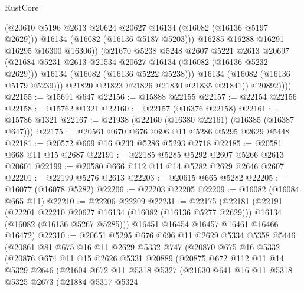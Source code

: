 \begin{lexlean}{RustCore}
\begin{coremodule}
                        (@20610 @5196 @2613 @20624 @20627 @16134 (@16082 (@16136 @5197 @2629)))
                        @16134
                        (@16082 (@16136 @5187 @5203)))
                      @16285
                      @16288
                      @16291
                      @16295
                      @16300
                      @16306))
                  (@21670
                    @5238
                    @5248
                    @2607
                    @5221
                    @2613
                    @20697
                    (@21684 @5231 @2613 @21534 @20627 @16134 (@16082 (@16136 @5232 @2629)))
                    @16134
                    (@16082 (@16136 @5222 @5238)))
                  @16134
                  (@16082 (@16136 @5179 @5239)))
                @21820
                @21823
                @21826
                @21830
                @21835
                @21841))
            @20892))))
@22155 := @15691 @647
@22156 := @15888 @22155
@22157 := @22154 @22156
@22158 := @15762 @1321
@22160 := @22157 (@16376 @22158)
@22161 := @15786 @1321
@22167 := @21938 (@22160 (@16380 @22161) (@16385 (@16387 @647)))
@22175 := @20561 @670 @676 @696 @11 @5286 @5295 @2629 @5448
@22181 := @20572 @669 @16 @233 @5286 @5293 @2718
@22185 := @20581 @668 @11 @15 @2687
@22191 := @22185 @5285 @5292 @2607 @5266 @2613 @20601
@22199 := @20580 @666 @112 @11 @14 @5282 @2629 @2646 @2607
@22201 := @22199 @5276 @2613
@22203 := @20615 @665 @5282
@22205 := @16077 (@16078 @5282)
@22206 := @22203 @22205
@22209 := @16082 (@16084 @665 @11)
@22210 := @22206 @22209
@22231 := @22175
    (@22181
      (@22191
        (@22201 @22210 @20627 @16134 (@16082 (@16136 @5277 @2629)))
        @16134
        (@16082 (@16136 @5267 @5285)))
      @16451
      @16454
      @16457
      @16461
      @16466
      @16472)
@22310 := @20651
    @5295
    @676
    @696
    @11
    @2629
    @5334
    @5358
    @5446
    (@20861
      @81
      @675
      @16
      @11
      @2629
      @5332
      @747
      (@20870
        @675
        @16
        @5332
        (@20876
          @674
          @11
          @15
          @2626
          @5331
          @20889
          (@20875
            @672
            @112
            @11
            @14
            @5329
            @2646
            (@21604
              @672
              @11
              @5318
              @5327
              (@21630
                @641
                @16
                @11
                @5318
                @5325
                @2673
                (@21884
                  @5317
                  @5324

\end{coremodule}
\end{lexlean}
